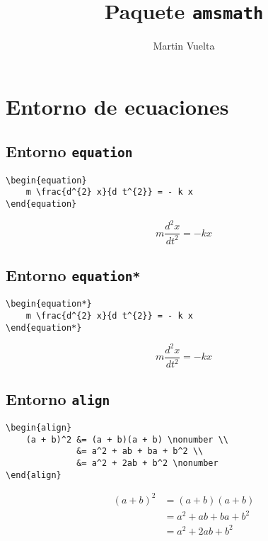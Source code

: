 \documentclass[12pt, a4paper]{article}
\begin{document}
\title{Paquete \texttt{amsmath}}
\author{Martin Vuelta}
\maketitle

\section{Entorno de ecuaciones}

\subsection{Entorno \texttt{equation}}
\begin{verbatim}
\begin{equation}
    m \frac{d^{2} x}{d t^{2}} = - k x
\end{equation}
\end{verbatim}

\begin{equation}
    m \frac{d^{2} x}{d t^{2}} = - k x
\end{equation}

\subsection{Entorno \texttt{equation*}}
\begin{verbatim}
\begin{equation*}
    m \frac{d^{2} x}{d t^{2}} = - k x
\end{equation*}
\end{verbatim}

\begin{equation*}
    m \frac{d^{2} x}{d t^{2}} = - k x
\end{equation*}

\subsection{Entorno \texttt{align}}
\begin{verbatim}
\begin{align}
    (a + b)^2 &= (a + b)(a + b) \nonumber \\
              &= a^2 + ab + ba + b^2 \\
              &= a^2 + 2ab + b^2 \nonumber
\end{align}
\end{verbatim}

\begin{align}
    (a + b)^2 &= (a + b)(a + b) \nonumber \\
              &= a^2 + ab + ba + b^2 \\
              &= a^2 + 2ab + b^2 \nonumber
\end{align}
\end{document}
